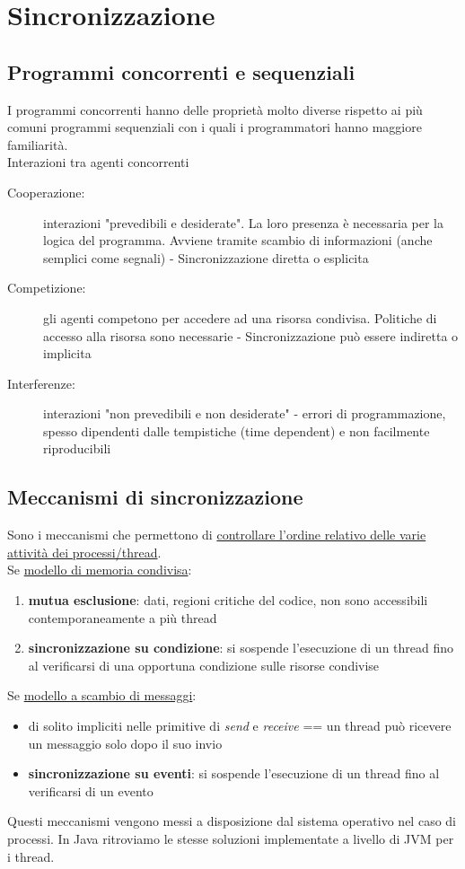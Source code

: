 \chapter{Sincronizzazione}
\section{Programmi concorrenti e sequenziali}
I programmi concorrenti hanno delle proprietà molto diverse rispetto ai più comuni programmi sequenziali con i quali i programmatori hanno maggiore familiarità.
\\Interazioni tra agenti concorrenti
\begin{description}
    \item[Cooperazione:] interazioni "prevedibili e desiderate". La loro presenza è necessaria per la logica del programma. Avviene tramite scambio di informazioni (anche semplici come segnali) - Sincronizzazione diretta o esplicita
    \item[Competizione:] gli agenti competono per accedere ad una risorsa condivisa. Politiche di accesso alla risorsa sono necessarie - Sincronizzazione può essere indiretta o implicita
    \item[Interferenze:] interazioni "non prevedibili e non desiderate" - errori di programmazione, spesso dipendenti dalle tempistiche (time dependent) e non facilmente riproducibili
\end{description}

\section{Meccanismi di sincronizzazione}
Sono i meccanismi che permettono di \underline{controllare l'ordine relativo delle varie attività dei processi/thread}.
\\Se \underline{modello di memoria condivisa}:
\begin{enumerate}
    \item \textbf{mutua esclusione}: dati, regioni critiche del codice, non sono accessibili contemporaneamente a più thread
    \item \textbf{sincronizzazione su condizione}: si sospende l'esecuzione di un thread fino al verificarsi di una opportuna condizione sulle risorse condivise
\end{enumerate}
Se \underline{modello a scambio di messaggi}:
\begin{itemize}
    \item di solito impliciti nelle primitive di \textit{send} e \textit{receive} == un thread può ricevere un messaggio solo dopo il suo invio
    \item \textbf{sincronizzazione su eventi}: si sospende l'esecuzione di un thread fino al verificarsi di un evento
\end{itemize}
Questi meccanismi vengono messi a disposizione dal sistema operativo nel caso di processi. In Java ritroviamo le stesse soluzioni implementate a livello di JVM per i thread.

